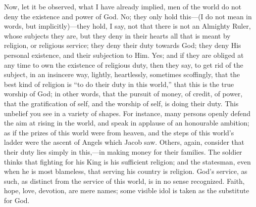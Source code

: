 Now, let it be observed, what I have already implied, men of the
world do not deny the existence and power of God. No; they only hold
this—(I do not mean in words, but implicitly)—they hold, I say,
not that there is not an Almighty Ruler, whose subjects they are, but
they deny in their hearts all that is meant by religion, or religious
service; they deny their duty towards God; they deny His personal
existence, and their subjection to Him. Yes; and if they are obliged
at any time to own the existence of religious duty, then they say, to
get rid of the subject, in an insincere way, lightly, heartlessly,
sometimes scoffingly, that the best kind of religion is ``to do
their duty in this world,'' that this is the true worship of God;
in other words, that the pursuit of money, of credit, of power, that
the gratification of self, and the worship of self, is doing their
duty. This unbelief you see in a variety of shapes. For instance, many
persons openly defend the aim at rising in the world, and speak in
applause of an honourable ambition; as if the prizes of this world
were from heaven, and the steps of this world's ladder were the ascent
of Angels which Jacob saw. Others, again, consider that their duty
lies simply in this,—in making money for their families. The soldier
thinks that fighting for his King is his sufficient religion; and the
statesman, even when he is most blameless, that serving his country is
religion. God's service, as such, as distinct from the service of this
world, is in no sense recognized. Faith, hope, love, devotion, are
mere names; some visible idol is taken as the substitute for God.

